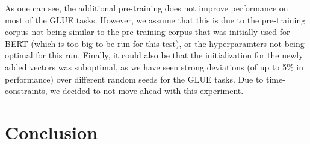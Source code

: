 \documentclass[a4paper,12pt,twoside,openright]{report}
\begin{document}
\hfill \break


\hfill \break

As one can see, the additional pre-training does not improve performance on most of the GLUE tasks.
However, we assume that this is due to the pre-training corpus not being similar to the pre-training corpus that was initially used for BERT (which is too big to be run for this test), or the hyperparamters not being optimal for this run.
Finally, it could also be that the initialization for the newly added vectors was suboptimal, as we have seen strong deviations (of up to 5\% in performance) over different random seeds for the GLUE tasks.
Due to time-constraints, we decided to not move ahead with this experiment.

\chapter{Conclusion}\label{section:Conclusion}
\end{document}

